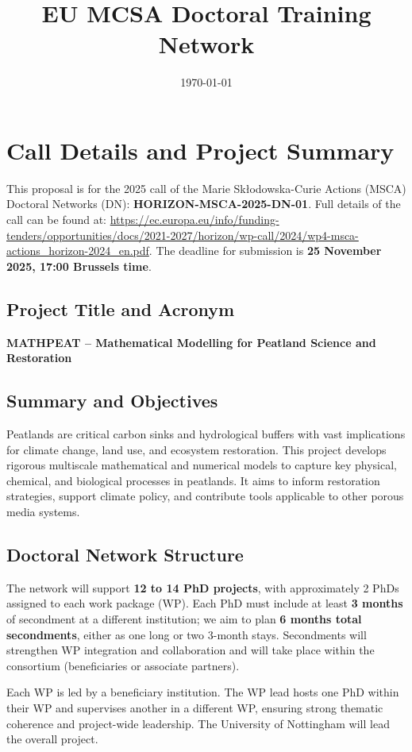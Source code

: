 \documentclass[12pt]{article}
\title{EU MCSA Doctoral Training Network}
\author{}
\date{\today}
\begin{document}
\maketitle

\section*{Call Details and Project Summary}

This proposal is for the 2025 call of the Marie Skłodowska-Curie Actions (MSCA) Doctoral Networks (DN): \textbf{HORIZON-MSCA-2025-DN-01}. Full details of the call can be found at: \url{https://ec.europa.eu/info/funding-tenders/opportunities/docs/2021-2027/horizon/wp-call/2024/wp4-msca-actions_horizon-2024_en.pdf}. The deadline for submission is \textbf{25 November 2025, 17:00 Brussels time}.

\subsection*{Project Title and Acronym}
\textbf{MATHPEAT – Mathematical Modelling for Peatland Science and Restoration}

\subsection*{Summary and Objectives}
Peatlands are critical carbon sinks and hydrological buffers with vast implications for climate change, land use, and ecosystem restoration. This project develops rigorous multiscale mathematical and numerical models to capture key physical, chemical, and biological processes in peatlands. It aims to inform restoration strategies, support climate policy, and contribute tools applicable to other porous media systems.

\subsection*{Doctoral Network Structure}
The network will support \textbf{12 to 14 PhD projects}, with approximately 2 PhDs assigned to each work package (WP). Each PhD must include at least \textbf{3 months} of secondment at a different institution; we aim to plan \textbf{6 months total secondments}, either as one long or two 3-month stays. Secondments will strengthen WP integration and collaboration and will take place within the consortium (beneficiaries or associate partners).

Each WP is led by a beneficiary institution. The WP lead hosts one PhD within their WP and supervises another in a different WP, ensuring strong thematic coherence and project-wide leadership. The University of Nottingham will lead the overall project.
\end{document}
